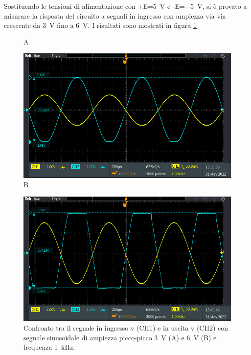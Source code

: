 Sostituendo le tensioni di alimentazione con +E=\SI{+5}{\volt} e -E=\SI{-5}{\volt}, si è provato a misurare la risposta del circuito a segnali in ingresso con ampiezza via via crescente da \SI{3}{\volt} fino a \SI{6}{\volt}. I risultati sono mostrati in figura \ref{fig:opamp_inv_sat}

\begin{figure}[h!]
	\centering
	A
	\vspace{0.5cm}
	
	\includegraphics[width=1\linewidth]{./ImageFiles/Laboratorio 4/TEK00008}
	B
	\vspace{0.5cm}
	
	\includegraphics[width=1\linewidth]{./ImageFiles/Laboratorio 4/TEK00012}
	\caption{Confronto tra il segnale in ingresso v (CH1)  e in uscita v (CH2) con segnale sinusoidale di ampiezza picco-picco \SI{3}{\volt} (A) e \SI{6}{\volt} (B) e frequenza \SI{1}{\kilo\hertz}.}
	\label{fig:opamp_inv_sat}
\end{figure}

